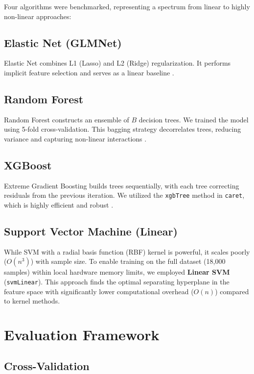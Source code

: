 Four algorithms were benchmarked, representing a spectrum from linear to highly non-linear approaches:

\subsection{Elastic Net (GLMNet)}

Elastic Net combines L1 (Lasso) and L2 (Ridge) regularization. It performs implicit feature selection and serves as a linear baseline \cite{zou2005regularization}.

\subsection{Random Forest}

Random Forest constructs an ensemble of $B$ decision trees. We trained the model using 5-fold cross-validation. This bagging strategy decorrelates trees, reducing variance and capturing non-linear interactions \cite{breiman2001random}.

\subsection{XGBoost}

Extreme Gradient Boosting builds trees sequentially, with each tree correcting residuals from the previous iteration. We utilized the \texttt{xgbTree} method in \texttt{caret}, which is highly efficient and robust \cite{chen2016xgboost}.

\subsection{Support Vector Machine (Linear)}

While SVM with a radial basis function (RBF) kernel is powerful, it scales poorly ($O(n^3)$) with sample size. To enable training on the full dataset (18,000 samples) within local hardware memory limits, we employed \textbf{Linear SVM} (\texttt{svmLinear}). This approach finds the optimal separating hyperplane in the feature space with significantly lower computational overhead ($O(n)$) compared to kernel methods.

\section{Evaluation Framework}

\subsection{Cross-Validation}

